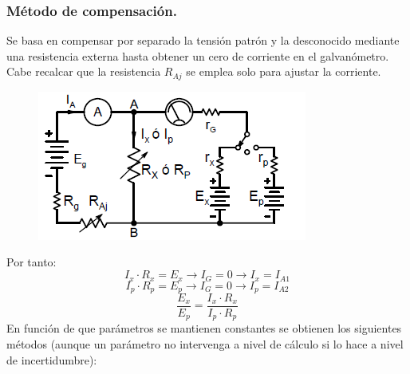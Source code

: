 \subsubsection{Método de compensación.}
Se basa en compensar por separado la tensión patrón y la desconocido mediante una resistencia externa hasta obtener un cero de corriente en el galvanómetro. Cabe recalcar que la resistencia $R_{Aj}$ se emplea solo para ajustar la corriente.
\begin{figure}[H]
	\centering
	\includegraphics[width=0.5\linewidth]{ImagenesTema4/8}
	\label{fig:8}
\end{figure}
Por tanto:
\[I_x\cdot R_x=E_x\rightarrow I_G=0\rightarrow I_x=I_{A1}\]
\[I_p\cdot R_p=E_p\rightarrow I_G=0\rightarrow I_p=I_{A2}\]
\[\frac{E_x}{E_p}=\frac{I_x\cdot R_x}{I_p \cdot R_p}\]
En función de que parámetros se mantienen constantes se obtienen los siguientes métodos (aunque un parámetro no intervenga a nivel de cálculo si lo hace a nivel de incertidumbre):
